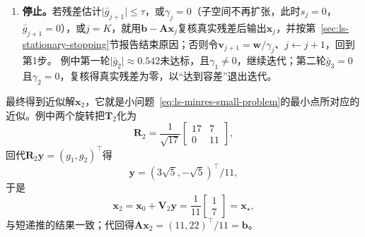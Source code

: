 \begin{enumerate}
 第一轮不满足第5步的停止条件，令$\bm v_2=\bm w/\gamma_1=(2,-1)^\top/\sqrt5$，进入第二轮。由第1步，
 \[
  a_2=3,\qquad \bm w=\bm 0,\qquad \gamma_2=0 ,
 \]
 第二列为$(1,3,0)^\top$。由第2步，先用第$0$个旋转得
 \[
  \epsilon_2=s_0\gamma_1=0,\qquad \theta=c_0\gamma_1=1 ,
 \]
 再用第$1$个旋转并构造新旋转，得
 \[
  \begin{gathered}
  \delta_2=\frac7{\sqrt{17}},\qquad \bar\delta=\frac{11}{\sqrt{17}},\qquad \rho_2=\frac{11}{\sqrt{17}},\\
  c_2=1,\qquad s_2=0 .
  \end{gathered}
 \]
 由第3步，
 \[
  g_2=-\frac{\sqrt5}{\sqrt{17}},\qquad \bar g_3=0 .
 \]
 由第4步，新方向为
 \[
  \bm d_2=\frac1{11\sqrt{85}}\begin{bmatrix}27\\-31\end{bmatrix},
 \]
 近似解更新为
 \[
  \bm x_2=\frac1{17}\begin{bmatrix}4\\8\end{bmatrix}-\frac1{187}\begin{bmatrix}27\\-31\end{bmatrix}=\frac1{11}\begin{bmatrix}1\\7\end{bmatrix}.
 \]

 \item \textbf{停止。}若残差估计$\lvert\bar g_{j+1}\rvert\le\tau$，或$\gamma_j=0$（子空间不再扩张，此时$s_j=0$，$\bar g_{j+1}=0$），或$j=K$，就用$\bm b-\bm A\bm x_j$复核真实残差后输出$\bm x_j$，并按第~\ref{sec:ls-stationary-stopping}节报告结束原因；否则令$\bm v_{j+1}=\bm w/\gamma_j$、$j\leftarrow j+1$，回到第1步。
 例中第一轮$\lvert\bar g_2\rvert\approx0.542$未达标，且$\gamma_1\ne0$，继续迭代；第二轮$\bar g_3=0$且$\gamma_2=0$，复核得真实残差为零，以“达到容差”退出迭代。
\end{enumerate}

最终得到近似解$\bm x_2$，它就是小问题~\eqref{eq:ls-minres-small-problem}的最小点所对应的近似。例中两个旋转把$\overline{\bm T}_2$化为
\[
 \bm R_2=\frac1{\sqrt{17}}\begin{bmatrix}17&7\\0&11\end{bmatrix},
\]
回代$\bm R_2\bm y=(g_1,g_2)^\top$得
\[
 \bm y=(3\sqrt5,-\sqrt5)^\top/11 ,
\]
于是
\[
 \bm x_2=\bm x_0+\bm V_2\bm y=\frac1{11}\begin{bmatrix}1\\7\end{bmatrix}=\bm x_\star ,
\]
与短递推的结果一致；代回得$\bm A\bm x_2=(11,22)^\top/11=\bm b$。

